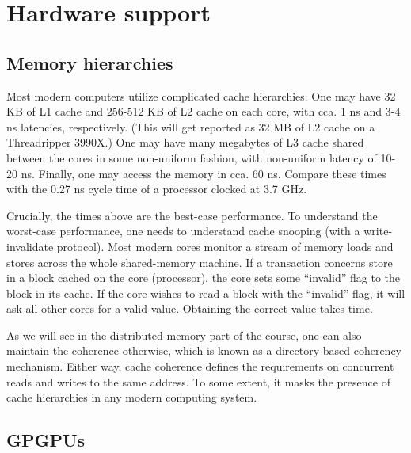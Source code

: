 \section{Hardware support}

\subsection{Memory hierarchies}

Most modern computers utilize complicated cache hierarchies. One may have 32 KB of L1 cache and 256-512 KB of L2 cache on each core, with cca. 1 ns and 3-4 ns latencies, respectively. (This will get reported as 32 MB of L2 cache on a Threadripper 3990X.) One may have many megabytes of L3 cache shared between the cores in some non-uniform fashion, with non-uniform latency of 10-20 ns. Finally, one may access the memory in cca. 60 ns. Compare these times with the 0.27 ns cycle time of a processor clocked at 3.7 GHz. 

Crucially, the times above are the best-case performance. To understand the worst-case performance, one needs to understand cache snooping (with a write-invalidate protocol). Most modern cores monitor a stream of memory loads and stores across the whole shared-memory machine. If a transaction concerns store in a block cached on the core (processor), the core sets some ``invalid'' flag to the block in its cache. If the core wishes to read a block with the ``invalid'' flag, it will ask all other cores for a valid value. Obtaining the correct value takes time. 

As we will see in the distributed-memory part of the course, one can also maintain the coherence otherwise, which is known as a directory-based coherency mechanism. Either way, cache coherence defines the requirements on concurrent reads and writes to the same address. To some extent, it masks the presence of cache hierarchies in any modern computing system. 

\subsection{GPGPUs}
\label{sec:GPGPUs}

